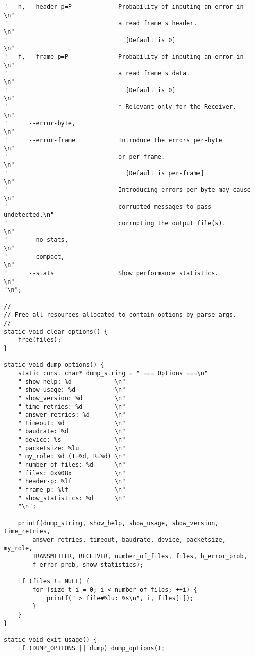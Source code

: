 \documentclass[subfiles]{main.tex}
\begin{document}
\begin{lstlisting}[style=rcom]
"  -h, --header-p=P             Probability of inputing an error in   \n"
"                               a read frame's header.                \n"
"                                 [Default is 0]                      \n"
"  -f, --frame-p=P              Probability of inputing an error in   \n"
"                               a read frame's data.                  \n"
"                                 [Default is 0]                      \n"
"                               * Relevant only for the Receiver.     \n"
"      --error-byte,                                                  \n"
"      --error-frame            Introduce the errors per-byte         \n"
"                               or per-frame.                         \n"
"                                 [Default is per-frame]              \n"
"                               Introducing errors per-byte may cause \n"
"                               corrupted messages to pass undetected,\n"
"                               corrupting the output file(s).        \n"
"      --no-stats,                                                    \n"
"      --compact,                                                     \n"
"      --stats                  Show performance statistics.          \n"
"\n";

//
// Free all resources allocated to contain options by parse_args.
//
static void clear_options() {
	free(files);
}

static void dump_options() {
	static const char* dump_string = " === Options ===\n"
	" show_help: %d            \n"
	" show_usage: %d           \n"
	" show_version: %d         \n"
	" time_retries: %d         \n"
	" answer_retries: %d       \n"
	" timeout: %d              \n"
	" baudrate: %d             \n"
	" device: %s               \n"
	" packetsize: %lu          \n"
	" my_role: %d (T=%d, R=%d) \n"
	" number_of_files: %d      \n"
	" files: 0x%08x            \n"
	" header-p: %lf            \n"
	" frame-p: %lf             \n"
	" show_statistics: %d      \n"
	"\n";
	
	printf(dump_string, show_help, show_usage, show_version, time_retries,
		answer_retries, timeout, baudrate, device, packetsize, my_role,
		TRANSMITTER, RECEIVER, number_of_files, files, h_error_prob,
		f_error_prob, show_statistics);
	
	if (files != NULL) {
		for (size_t i = 0; i < number_of_files; ++i) {
			printf(" > file#%lu: %s\n", i, files[i]);
		}
	}
}

static void exit_usage() {
	if (DUMP_OPTIONS || dump) dump_options();
	

\end{lstlisting}
\end{document}
